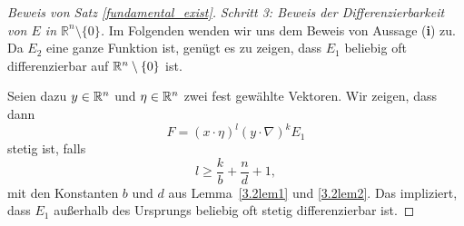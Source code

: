 \begin{proof}[Beweis von Satz \ref{fundamental_exist}]
\medskip
\noindent
{\em Schritt 3: Beweis der Differenzierbarkeit von $E$ in $\mathbb R^n\setminus\{0\}$.}
Im Folgenden wenden wir uns dem Beweis von Aussage ({\bf i}) zu. Da $E_2$ eine ganze Funktion ist, genügt es zu zeigen, dass $E_1$ beliebig oft differenzierbar auf $\mathbb R^n\setminus\{0\}$ ist.  

Seien dazu $y\in\mathbb R^n$ und $\eta\in\mathbb R^n$ zwei fest gewählte Vektoren.  Wir zeigen, dass dann
\begin{equation}
F= (x\cdot \eta)^l (y \cdot \nabla)^k E_1
\end{equation}
stetig ist, falls
\begin{equation}\label{3.2l}
l\ge \frac{k}{b}+\frac nd +1, 
\end{equation}
mit den Konstanten $b$ und $d$ aus Lemma~\ref{3.2lem1} und \ref{3.2lem2}. Das impliziert, dass  $E_1$  außerhalb des Ursprungs beliebig oft stetig differenzierbar ist.  %


\end{proof}
